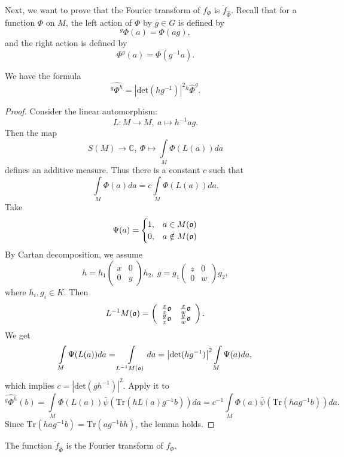 Next, we want to prove that the Fourier transform of $f_\Phi$ is $\check f _{\widehat \Phi}$. Recall that for a function $\Phi$  on $M$, the left action of $\Phi$ by $g\in G$ is defined by
\[
^g \Phi (a) =\Phi(ag),
\]
and the right action is defined by
\[
\Phi ^g(a) =\Phi(g^{-1} a).
\]

\begin{lemma}\label{lem1}
We have the formula
\[
\widehat {^{g}\Phi^{h}}=\left | \mathrm {det} (hg^{-1}) \right |^2 {^{h}}{\widehat \Phi}^{g}.
\]
\end{lemma}

\begin{proof}
Consider the linear automorphism:
\[
L\colon M\to M,\ a\mapsto h^{-1}ag.
\]
Then the map
\[
S(M)\to \mathbb C,\ \Phi\mapsto \int\limits_M\Phi(L(a)) da
\]
defines an additive measure. Thus there is a constant $c$ such that
\[
\int\limits_M \Phi(a)da=c\int\limits_M \Phi(L(a)) da.
\]
Take
\[
  \Psi(a)=\begin{cases}
    1, &a\in M (\mathfrak o)\\
    0, &a\notin M(\mathfrak o)
\end{cases}
\]
By Cartan decomposition, we assume
\[
h= h_1 \left( \begin{array}{cc}
x & 0\\
0 & y
\end{array}
\right) h_2, \
g= g_1 \left( \begin{array}{cc}
z & 0\\
0 & w
\end{array}
\right) g_2,
\]
where $h_i, g_i \in K$.
Then
\[
L^{-1} M (\mathfrak o)=\left( \begin{array}{cc}
\frac x z \mathfrak o & \frac x w \mathfrak o\\
\frac y z \mathfrak o & \frac y w \mathfrak o
\end{array}
\right).
\]
We get
\[
\int\limits_M \Psi(L(a))da=\int \limits_{L^{-1} M (\mathfrak o)} da=\left |\mathrm{det} (hg^{-1})\right |^2\int\limits_M \Psi(a)da,
\]
which implies $c= \left |\mathrm {det} (gh^{-1})\right |^2$.
Apply it to
\[
\widehat {^{g}\Phi^{h}}(b) =\int\limits _M \Phi(L(a)) \bar {\psi}(\mathrm {Tr}(hL(a)g^{-1}b))da=c^{-1}\int\limits _M \Phi(a) \bar {\psi}(\mathrm {Tr}(hag^{-1}b))da.
\]
Since $\mathrm{Tr}(hag^{-1}b)=\mathrm{Tr}(ag^{-1}bh)$, the lemma holds.
\end{proof}

\begin{proposition}\label{1.3.4}
The function $\check f_{\hat \Phi}$ is the Fourier transform of $f_\Phi$.
\end{proposition}

